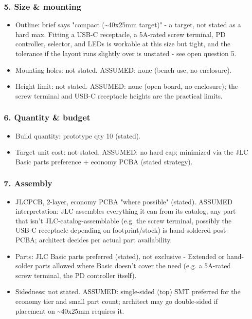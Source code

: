 \documentclass[11pt,a4paper]{article}
\begin{document}
\subsubsection*{5. Size \& mounting}
\begin{itemize}
\item Outline: brief says "compact (\textasciitilde{}40x25mm target)" - a target, not stated
as a hard max. Fitting a USB-C receptacle, a 5A-rated screw terminal, PD
controller, selector, and LEDs is workable at this size but tight, and
the tolerance if the layout runs slightly over is unstated - see open
question 5.
\item Mounting holes: not stated. ASSUMED: none (bench use, no enclosure).
\item Height limit: not stated. ASSUMED: none (open board, no enclosure); the
screw terminal and USB-C receptacle heights are the practical limits.
\end{itemize}
\subsubsection*{6. Quantity \& budget}
\begin{itemize}
\item Build quantity: prototype qty 10 (stated).
\item Target unit cost: not stated. ASSUMED: no hard cap; minimized via the
JLC Basic parts preference + economy PCBA (stated strategy).
\end{itemize}
\subsubsection*{7. Assembly}
\begin{itemize}
\item JLCPCB, 2-layer, economy PCBA "where possible" (stated). ASSUMED
interpretation: JLC assembles everything it can from its catalog; any
part that isn't JLC-catalog-assemblable (e.g. the screw terminal,
possibly the USB-C receptacle depending on footprint/stock) is
hand-soldered post-PCBA; architect decides per actual part availability.
\item Parts: JLC Basic parts preferred (stated), not exclusive - Extended or
hand-solder parts allowed where Basic doesn't cover the need (e.g. a
5A-rated screw terminal, the PD controller itself).
\item Sidedness: not stated. ASSUMED: single-sided (top) SMT preferred for the
economy tier and small part count; architect may go double-sided if
placement on \textasciitilde{}40x25mm requires it.
\end{itemize}
\end{document}
